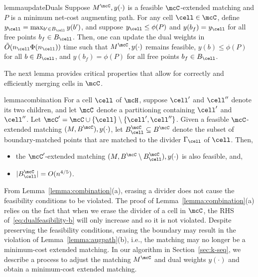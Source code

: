 \begin{restatable}{lemma}{updateDuals}\label{lemma:fresh_duals}
        Suppose $M^\mcC, y(\cdot)$ is a feasible $\mcC$-extended matching and $P$ is a minimum net-cost augmenting path. For any cell $\cell\in\mcC$, define $y_\cell=\max_{b' \in B_{\cell}} y(b')$, and suppose $y_\cell\le \phi(P)$ and $y(b_f)=y_\cell$ for all free points $b_f\in B_\cell$. Then, one can update the dual weights in $\tilde{O}(n_\cell\Phi(n_\cell))$ time such that $M^\mcC, y(\cdot)$ remains feasible, $y(b)\le \phi(P)$ for all $b\in B_\cell$, and $y(b_f)=\phi(P)$ for all free points $b_f\in B_\cell$.
\end{restatable}

\vspace{0.5em}
The next lemma provides critical properties that allow for correctly and efficiently merging cells in $\mcC$. 


\begin{restatable}{lemma}{combination}\label{lemma:combination}
    For a cell $\cell$ of $\mcH$, suppose $\cell'$ and $\cell''$ denote its two children, and let $\mcC$ denote a partitioning containing $\cell'$ and $\cell''$. Let $\mcC'=\mcC\cup\{\cell\}\setminus\{\cell',\cell''\}$. Given a feasible $\mcC$-extended matching $(M, B^\mcC), y(\cdot)$, let $B_\cell^\mcC\subseteq B^\mcC$ denote the subset of boundary-matched points that are matched to the divider $\Gamma_\cell$ of $\cell$. Then,
    \begin{itemize}
        \item[(a)] the $\mcC'$-extended matching $(M, B^\mcC\setminus B_\cell^\mcC), y(\cdot)$ is also feasible, and,
        \item[(b)]  $|B_\cell^\mcC|=O(n^{4/5})$.
    \end{itemize}
\end{restatable}

\vspace{1em}

From Lemma~\ref{lemma:combination}(a), erasing a divider  does not cause the feasibility conditions to be violated. The proof of Lemma~\ref{lemma:combination}(a) relies on the fact that when we erase the divider of a cell in $\mcC$, the RHS of~\eqref{eq:dualfeasibility-b} will only increase and so it is not violated. Despite preserving the feasibility conditions, erasing the boundary may result in the violation of Lemma~\ref{lemma:augpath}(b), i.e., the matching may no longer be a minimum-cost extended matching. 
In our algorithm in Section~\ref{sec:k-seq}, we describe a process to adjust the matching $M^\mcC$ and dual weights $y(\cdot)$ and obtain a minimum-cost extended matching. 


